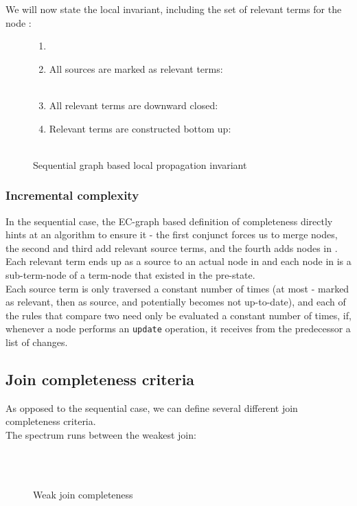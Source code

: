 We will now state the local invariant, including the set of relevant terms  for the node :
\begin{figure}[H]
\begin{enumerate}
	\item 
		\\
	\item All sources are marked as relevant terms:\\
		\\
	\item All relevant terms are downward closed:\\
	\item Relevant terms are constructed bottom up:\\
		\\
\end{enumerate}
\caption{Sequential graph based local propagation invariant}
\end{figure}


\subsubsection{Incremental complexity}
In the sequential case, the EC-graph based definition of \GFA{} completeness directly hints at an algorithm to ensure it - the first conjunct forces us to merge nodes,
the second and third add relevant source terms, and the fourth adds nodes in .\\
Each relevant term ends up as a source to an actual node in  and each node in  is
a sub-term-node of a term-node that existed in the pre-state.\\
Each source term is only traversed a constant number of times (at most - marked as relevant, then as source, and potentially becomes not up-to-date), and each of the rules that compare two \GFAs{} need only be evaluated a constant number of times, if, whenever a node performs an \lstinline{update} operation, it receives from the predecessor a list of changes.

\newpage
\subsection{Join completeness criteria}
As opposed to the sequential case, we can define several different join completeness criteria.\\
The spectrum runs between the weakest join:
\begin{figure}[H]
\\
\\
\caption{Weak join completeness}
\end{figure}

